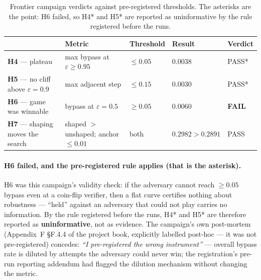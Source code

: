 \documentclass{article}
\begin{document}
\begin{table}[h]
\centering
\begin{tabular}{lllll}
\toprule
 & Metric & Threshold & Result & Verdict \\
\midrule
\textbf{H4} --- plateau & max bypass at $\varepsilon \geq 0.95$ & $\leq 0.05$ & 0.0038 & PASS* \\
\textbf{H5} --- no cliff above $\varepsilon = 0.9$ & max adjacent step & $\leq 0.15$ & 0.0030 & PASS* \\
\textbf{H6} --- game was winnable & bypass at $\varepsilon = 0.5$ & $\geq 0.05$ & 0.0060 & \textbf{FAIL} \\
\textbf{H7} --- shaping moves the search & shaped $>$ unshaped; anchor $\leq 0.01$ & both & $0.2982 > 0.2891$ & PASS \\
\bottomrule
\end{tabular}
\caption{Frontier campaign verdicts against pre-registered thresholds. The asterisks are the point: H6 failed, so H4* and H5* are reported as uninformative by the rule registered before the runs.}
\end{table}

\paragraph{H6 failed, and the pre-registered rule applies (that is the asterisk).} H6 was this campaign's validity check: if the adversary cannot reach $\geq 0.05$ bypass even at a coin-flip verifier, then a flat curve certifies nothing about robustness --- ``held'' against an adversary that could not play carries no information. By the rule registered before the runs, H4* and H5* are therefore reported as \textbf{uninformative}, not as evidence. The campaign's own post-mortem (Appendix~F \S F.4.4 of the project book, explicitly labelled post-hoc --- it was not pre-registered) concedes: \emph{``I pre-registered the wrong instrument''} --- overall bypass rate is diluted by attempts the adversary could never win; the registration's pre-run reporting addendum had flagged the dilution mechanism without changing the metric.
\end{document}
